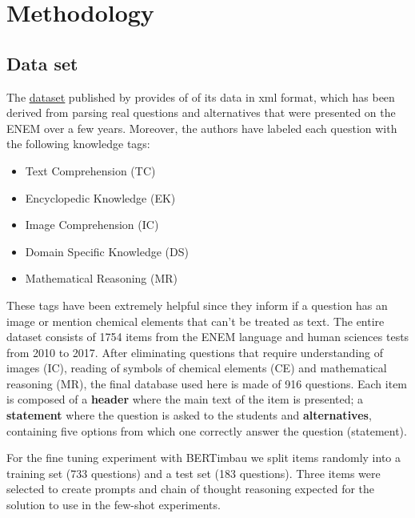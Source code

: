 \documentclass{article}
\begin{document}
\section{Methodology}

\subsection{Data set}

The \href{https://www.ime.usp.br/~ddm/project/enem/ENEMdataset.zip}{\underline{dataset}} published by \cite{DBLP:journals/corr/abs-2201-11903} provides of of its data in xml format, which has been derived from parsing real questions and alternatives that were presented on the ENEM over a few years. Moreover, the authors have labeled each question with the following knowledge tags:

\vspace{-0.15cm}
\begin{itemize}%
  \item Text Comprehension (TC)
  \vspace{-0.25cm}
  \item Encyclopedic Knowledge (EK)
  \vspace{-0.25cm}
  \item Image Comprehension (IC)
  \vspace{-0.25cm}
  \item Domain Speciﬁc Knowledge (DS)
  \vspace{-0.25cm}
  \item Mathematical Reasoning (MR)
\end{itemize}
\vspace{-0.05cm}

These tags have been extremely helpful since they inform if a question has an image or mention chemical elements that can't be treated as text. The entire dataset consists of 1754 items from the ENEM language and human sciences tests from 2010 to 2017. After eliminating questions that require understanding of images (IC), reading of symbols of chemical elements (CE) and mathematical reasoning (MR), the final database used here is made of 916 questions. Each item is composed of a \textbf{header} where the main text of the item is presented; a \textbf{statement} where the question is asked to the students and \textbf{alternatives}, containing five options from which one correctly answer the question (statement).

For the fine tuning experiment with BERTimbau we split items randomly into a training set (733 questions) and a test set (183 questions). Three items were selected to create prompts and chain of thought reasoning expected for the solution to use in the few-shot experiments. 
\end{document}
